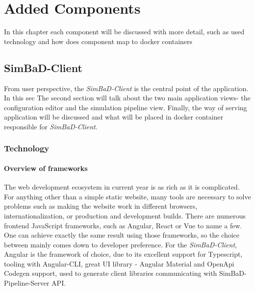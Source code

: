 \chapter{Added Components}
In this chapter each component will be discussed with more detail, such as used technology and how does component map to docker containers
\section{SimBaD-Client}
From user perspective, the \textit{SimBaD-Client} is the central point of the application. In this sec
The second section will talk about the two main application views- the configuration editor and the simulation pipeline view. Finally, the way of serving application will be discussed and what will be placed in docker container responsible for \textit{SimBaD-Client}.
\subsection{Technology}
\subsubsection{Overview of frameworks}
The web development ecosystem in current year is as rich as it is complicated.  For anything other than a simple static website, many tools are necessary to solve problems such as making the website work in different browsers, internationalization, or production and development builds. There are numerous frontend JavaScript frameworks, such as Angular, React or Vue to name a few. One can achieve exactly the same result using those frameworks, so the choice between mainly comes down to developer preference. For the \textit{SimBaD-Client}, Angular is the framework of choice, due to its excellent support for Typescript, tooling with Angular-CLI, great UI library - Angular Material and OpenApi Codegen support, used to generate client libraries communicating with SimBaD-Pipeline-Server API. 
